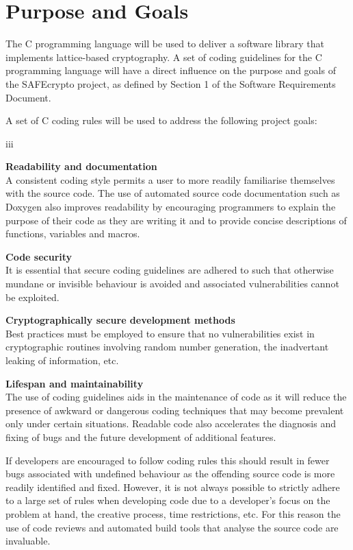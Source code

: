 \chapter{Purpose and Goals}
\label{ch_goals}

The C programming language will be used to deliver a software library that implements lattice-based cryptography. A set of coding guidelines for the C programming language will have a direct influence on the purpose and goals of the SAFEcrypto project, as defined by Section 1 of the Software Requirements Document.

\noindent A set of C coding rules will be used to address the following project goals:

\begin{labeling}{iii}
\item [i] \textbf{Readability and documentation} \\
A consistent coding style permits a user to more readily familiarise themselves with the source code. The use of automated source code documentation such as Doxygen also improves readability by encouraging programmers to explain the purpose of their code as they are writing it and to provide concise descriptions of functions, variables and macros.
\item [ii] \textbf{Code security}\\
It is essential that secure coding guidelines are adhered to such that otherwise mundane or invisible behaviour is avoided and associated vulnerabilities cannot be exploited.
\item [iii] \textbf{Cryptographically secure development methods}\\
Best practices must be employed to ensure that no vulnerabilities exist in cryptographic routines involving random number generation, the inadvertant leaking of information, etc.
\item [iv] \textbf{Lifespan and maintainability}\\
The use of coding guidelines aids in the maintenance of code as it will reduce the presence of awkward or dangerous coding techniques that may become prevalent only under certain situations. Readable code also accelerates the diagnosis and fixing of bugs and the future development of additional features.
\end{labeling}

If developers are encouraged to follow coding rules this should result in fewer bugs associated with undefined behaviour as the offending source code is more readily identified and fixed. However, it is not always possible to strictly adhere to a large set of rules when developing code due to a developer's focus on the problem at hand, the creative process, time restrictions, etc. For this reason the use of code reviews and automated build tools that analyse the source code are invaluable.

